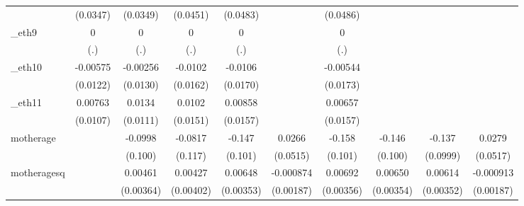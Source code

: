 \begin{table}[htbp]
\begin{tabular}{l*{9}{c}}
            &    (0.0347)         &    (0.0349)         &    (0.0451)         &    (0.0483)         &                     &    (0.0486)         &                     &                     &                     \\
[1em]
\_eth9       &           0         &           0         &           0         &           0         &                     &           0         &                     &                     &                     \\
            &         (.)         &         (.)         &         (.)         &         (.)         &                     &         (.)         &                     &                     &                     \\
[1em]
\_eth10      &    -0.00575         &    -0.00256         &     -0.0102         &     -0.0106         &                     &    -0.00544         &                     &                     &                     \\
            &    (0.0122)         &    (0.0130)         &    (0.0162)         &    (0.0170)         &                     &    (0.0173)         &                     &                     &                     \\
[1em]
\_eth11      &     0.00763         &      0.0134         &      0.0102         &     0.00858         &                     &     0.00657         &                     &                     &                     \\
            &    (0.0107)         &    (0.0111)         &    (0.0151)         &    (0.0157)         &                     &    (0.0157)         &                     &                     &                     \\
[1em]
motherage   &                     &     -0.0998         &     -0.0817         &      -0.147         &      0.0266         &      -0.158         &      -0.146         &      -0.137         &      0.0279         \\
            &                     &     (0.100)         &     (0.117)         &     (0.101)         &    (0.0515)         &     (0.101)         &     (0.100)         &    (0.0999)         &    (0.0517)         \\
[1em]
motheragesq &                     &     0.00461         &     0.00427         &     0.00648\sym{*}  &   -0.000874         &     0.00692\sym{*}  &     0.00650\sym{*}  &     0.00614\sym{*}  &   -0.000913         \\
            &                     &   (0.00364)         &   (0.00402)         &   (0.00353)         &   (0.00187)         &   (0.00356)         &   (0.00354)         &   (0.00352)         &   (0.00187)         \\

\end{tabular}
\end{table}

